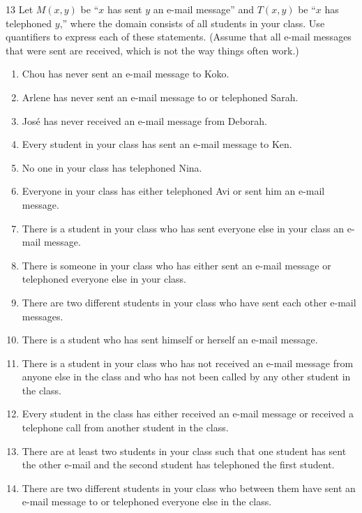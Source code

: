 \documentclass[11pt]{article}
\begin{document}
\begin{exercise}{13}
    Let $M(x,y)$ be ``$x$ has sent $y$ an e-mail message'' and
    $T(x,y)$ be ``$x$ has telephoned $y$,'' where the domain consists
    of all students in your class. Use quantifiers to express each of
    these statements. (Assume that all e-mail messages that were sent
    are received, which is not the way things often work.)
    \begin{enumerate}[label=(\alph*)]
        \item Chou has never sent an e-mail message to Koko.
        \item Arlene has never sent an e-mail message to or telephoned Sarah.
        \item José has never received an e-mail message from Deborah.
        \item Every student in your class has sent an e-mail message to Ken.
        \item No one in your class has telephoned Nina.
        \item Everyone in your class has either telephoned Avi or sent him an e-mail message.
        \item There is a student in your class who has sent everyone else in your class an e-mail message.
        \item There is someone in your class who has either sent an e-mail message or telephoned everyone else in your class.
        \item There are two different students in your class who have sent each other e-mail messages.
        \item There is a student who has sent himself or herself an e-mail message.
        \item There is a student in your class who has not received an e-mail message from anyone else in the class and who has not been called by any other student in the class.
        \item Every student in the class has either received an e-mail message or received a telephone call from another student in the class.
        \item There are at least two students in your class such that one student has sent the other e-mail and the second student has telephoned the first student.
        \item There are two different students in your class who between them have sent an e-mail message to or telephoned everyone else in the class.
    \end{enumerate}
\end{exercise}
\end{document}
